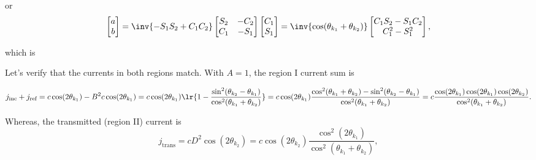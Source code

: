 \begin{enumerate}[(i)]
or
\begin{dmath}\label{eqn:gradQuantumProblemSet4Problem3:820}
\begin{bmatrix}
a \\
b
\end{bmatrix}
=
\inv{- S_1 S_2 + C_1 C_2 }
\begin{bmatrix}
S_2 & -C_2 \\
C_1 & -S_1
\end{bmatrix}
\begin{bmatrix}
C_1 \\
S_1
\end{bmatrix}
=
\inv{\cos(\theta_{k_1} + \theta_{k_2})}
\begin{bmatrix}
C_1 S_2 - S_1 C_2 \\
C_1^2 - S_1^2
\end{bmatrix},
\end{dmath}

which is

Let's verify that the currents in both regions match.  With \( A = 1 \), the region I current sum is

\begin{dmath}\label{eqn:gradQuantumProblemSet4Problem3:1000}
j_{\textrm{inc}}
+ j_{\textrm{ref}}
=
c \cos( 2 \theta_{k_1} ) - B^2 c \cos( 2 \theta_{k_1} )
=
c \cos( 2 \theta_{k_1} )
\lr{ 1 -
\frac{ \sin^2(\theta_{k_2} - \theta_{k_1}) }{\cos^2(\theta_{k_1} + \theta_{k_2})} }
=
c \cos( 2 \theta_{k_1} )
\frac{ \cos^2(\theta_{k_1} + \theta_{k_2}) - \sin^2(\theta_{k_2} - \theta_{k_1}) }{\cos^2(\theta_{k_1} + \theta_{k_2})}
=
c
\frac{ \cos( 2 \theta_{k_1} ) \cos(2 \theta_{k_1}) \cos(2 \theta_{k_2})}
{\cos^2(\theta_{k_1} + \theta_{k_2})}.
\end{dmath}

Whereas, the transmitted (region II) current is
\begin{dmath}\label{eqn:gradQuantumProblemSet4Problem3:1020}
j_{\textrm{trans}}
=
 c D^2 \cos( 2 \theta_{k_2} )
=
 c \cos( 2 \theta_{k_2} )
\frac{ \cos^2(2 \theta_{k_1}) }{\cos^2(\theta_{k_1} + \theta_{k_2})},
\end{dmath}


\end{enumerate}
